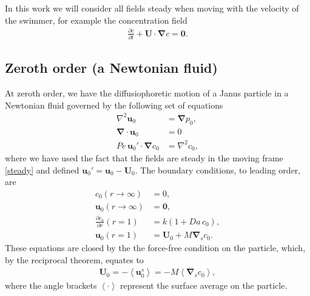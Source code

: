 \documentclass[aps,pre,reprint,twocolumn,notitlepage,superscriptaddress]{revtex4-1}
\begin{document}
In this work we will consider all fields steady when moving with the velocity of the swimmer, for example the concentration field
\begin{align}
\frac{\partial c}{\partial t}+\boldsymbol{U}\cdot\boldsymbol{\nabla} c = \boldsymbol{0}.\label{steady}
\end{align}

\subsection{Zeroth order (a Newtonian fluid)}

At zeroth order, we have the diffusiophoretic motion of a Janus particle in a Newtonian fluid governed by the following set of equations
\begin{align}
\nabla^{2}\boldsymbol{u}_{0}&=\boldsymbol{\nabla} p_{0},\label{veloN}\\
\boldsymbol{\nabla} \cdot \boldsymbol{u}_{0} &= 0\\
Pe\,\boldsymbol{u}_{0}' \cdot \boldsymbol{\nabla} c_{0} &= \nabla^{2} c_{0},\label{concN}
\end{align}
where we have used the fact that the fields are steady in the moving frame \eqref{steady} and defined $\boldsymbol{u}_{0}' = \boldsymbol{u}_{0}-\boldsymbol{U}_{0}$. The boundary conditions, to leading order, are 
\begin{align}
c_{0}\left(r\longrightarrow \infty\right)&= 0,\label{conbcN}\\
\boldsymbol{u}_{0}\left(r\longrightarrow \infty\right)&= \boldsymbol{0},\\
	\frac{\partial c_{0}}{\partial r}(r=1)&=k(1+Da\,c_{0}), \label{cocbN}\\
	\boldsymbol{u}_{0}(r=1)&=\boldsymbol{U}_{0}+M\boldsymbol{\nabla}_s c_{0}.
\end{align}
These equations are closed by the the force-free condition on the particle, which, by the reciprocal theorem, equates to
\begin{align}
\boldsymbol{U}_{0}=-\left\langle\boldsymbol{u}_0^{s}\right\rangle = -M\left\langle \boldsymbol{\nabla}_s c_{0} \right\rangle,
\end{align}
where the angle brackets $\left\langle \cdot\right\rangle$ represent the surface average on the particle. 
\end{document}

